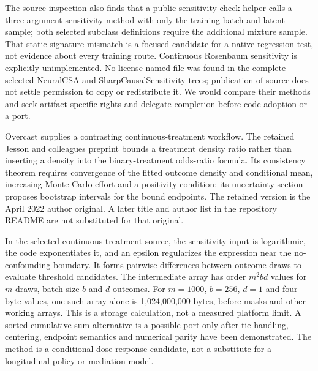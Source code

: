 The source inspection also finds that a public sensitivity-check helper calls a three-argument sensitivity method with only the training batch and latent sample; both selected subclass definitions require the additional mixture sample. That static signature mismatch is a focused candidate for a native regression test, not evidence about every training route. Continuous Rosenbaum sensitivity is explicitly unimplemented. No license-named file was found in the complete selected NeuralCSA and SharpCausalSensitivity trees; publication of source does not settle permission to copy or redistribute it. We would compare their methods and seek artifact-specific rights and delegate completion before code adoption or a port. \cite{exec25_pymed_neuralcsa,exec25_pymed_sharp,exec25_pymed_choice}

Overcast supplies a contrasting continuous-treatment workflow. The retained Jesson and colleagues preprint bounds a treatment density ratio rather than inserting a density into the binary-treatment odds-ratio formula. Its consistency theorem requires convergence of the fitted outcome density and conditional mean, increasing Monte Carlo effort and a positivity condition; its uncertainty section proposes bootstrap intervals for the bound endpoints. The retained version is the April 2022 author original. A later title and author list in the repository README are not substituted for that original. \cite{exec25_pymed_overcast_paper,exec25_pymed_overcast}

In the selected continuous-treatment source, the sensitivity input is logarithmic, the code exponentiates it, and an epsilon regularizes the expression near the no-confounding boundary. It forms pairwise differences between outcome draws to evaluate threshold candidates. The intermediate array has order $m^2bd$ values for $m$ draws, batch size $b$ and $d$ outcomes. For $m=1000$, $b=256$, $d=1$ and four-byte values, one such array alone is 1,024,000,000 bytes, before masks and other working arrays. This is a storage calculation, not a measured platform limit. A sorted cumulative-sum alternative is a possible port only after tie handling, centering, endpoint semantics and numerical parity have been demonstrated. The method is a conditional dose-response candidate, not a substitute for a longitudinal policy or mediation model. \cite{exec25_pymed_overcast,exec25_pymed_choice}


